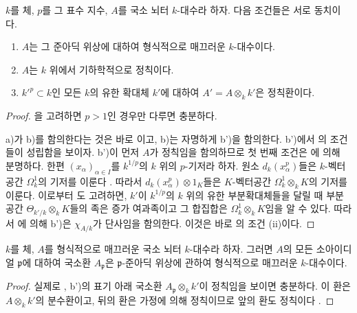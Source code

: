 \begin{theorem}[22.5.8]
\label{0.22.5.8-ko}
$k$를 체, $p$를 그 표수 지수, $A$를 국소 뇌터 $k$-대수라 하자.
다음 조건들은 서로 동치이다.
\begin{enumerate}
  \item[a)] $A$는 그 준아딕 위상에 대하여 형식적으로 매끄러운
  $k$-대수이다.
  \item[b)] $A$는 $k$ 위에서 기하학적으로 정칙이다.
  \item[b')] $k'^p\subset k$인 모든 $k$의 유한 확대체 $k'$에 대하여
  $A'=A\otimes_kk'$은 정칙환이다.
\end{enumerate}
\end{theorem}

\begin{proof}
을 고려하면 $p>1$인 경우만 다루면 충분하다.

a)가 b)를 함의한다는 것은 바로 이고, b)는
자명하게 b')을 함의한다. b')에서 의 조건들이
성립함을 보이자. b')이 먼저 $A$가 정칙임을 함의하므로 첫 번째 조건은
에 의해 분명하다. 한편
$(x_\alpha)_{\alpha\in I}$를 $k^{1/p}$의 $k$ 위의 $p$-기저라 하자.
원소 $d_k(x_\alpha^p)$들은 $k$-벡터공간 $\Omega^1_k$의 기저를
이룬다 . 따라서
$d_k(x_\alpha^p)\otimes1_K$들은 $K$-벡터공간
$\Omega^1_k\otimes_kK$의 기저를 이룬다. 이로부터
도 고려하면, $k'$이 $k^{1/p}$의 $k$ 위의 유한
부분확대체들을 달릴 때 부분공간 $\Theta_{k'/k}\otimes_kK$들의 족은
증가 여과족이고 그 합집합은 $\Omega^1_k\otimes_kK$임을 알 수 있다.
따라서 에 의해 b')은 $\chi_{A/k}$가 단사임을
함의한다. 이것은 바로 의 조건 (ii)이다.
\end{proof}

\begin{corollary}[22.5.9]
\label{0.22.5.9-ko}
$k$를 체, $A$를 형식적으로 매끄러운 국소 뇌터 $k$-대수라 하자.
그러면 $A$의 모든 소아이디얼 $\mathfrak p$에 대하여 국소환
$A_{\mathfrak p}$은 $\mathfrak p$-준아딕 위상에 관하여 형식적으로
매끄러운 $k$-대수이다.
\end{corollary}

\begin{proof}
실제로 , b')의 표기 아래 국소환
$A_{\mathfrak p}\otimes_kk'$이 정칙임을 보이면 충분하다. 이 환은
$A\otimes_kk'$의 분수환이고, 뒤의 환은 가정에 의해 정칙이므로 앞의
환도 정칙이다 .
\end{proof}


